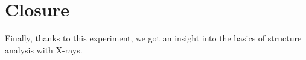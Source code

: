 
\chapter{Closure}
\label{chap:close}

Finally, thanks to this experiment, we got an insight into the basics of structure analysis with X-rays.